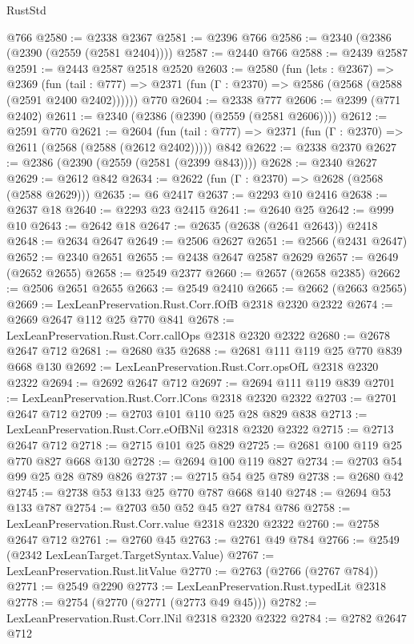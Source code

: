 \begin{lexlean}{RustStd}
\begin{coremodule}
    @766
@2580 := @2338 @2367
@2581 := @2396 @766
@2586 := @2340 (@2386 (@2390 (@2559 (@2581 @2404))))
@2587 := @2440 @766
@2588 := @2439 @2587
@2591 := @2443 @2587 @2518 @2520
@2603 := @2580
    (fun (lets : @2367) =>
    @2369
      (fun (tail : @777) => @2371 (fun (Γ : @2370) => @2586 (@2568 (@2588 (@2591 @2400 @2402))))))
    @770
@2604 := @2338 @777
@2606 := @2399 (@771 @2402)
@2611 := @2340 (@2386 (@2390 (@2559 (@2581 @2606))))
@2612 := @2591 @770
@2621 := @2604
    (fun (tail : @777) => @2371 (fun (Γ : @2370) => @2611 (@2568 (@2588 (@2612 @2402)))))
    @842
@2622 := @2338 @2370
@2627 := @2386 (@2390 (@2559 (@2581 (@2399 @843))))
@2628 := @2340 @2627
@2629 := @2612 @842
@2634 := @2622 (fun (Γ : @2370) => @2628 (@2568 (@2588 @2629)))
@2635 := @6 @2417
@2637 := @2293 @10 @2416
@2638 := @2637 @18
@2640 := @2293 @23 @2415
@2641 := @2640 @25
@2642 := @999 @10
@2643 := @2642 @18
@2647 := @2635 (@2638 (@2641 @2643)) @2418
@2648 := @2634 @2647
@2649 := @2506 @2627
@2651 := @2566 (@2431 @2647)
@2652 := @2340 @2651
@2655 := @2438 @2647 @2587 @2629
@2657 := @2649 (@2652 @2655)
@2658 := @2549 @2377
@2660 := @2657 (@2658 @2385)
@2662 := @2506 @2651 @2655
@2663 := @2549 @2410
@2665 := @2662 (@2663 @2565)
@2669 := LexLeanPreservation.Rust.Corr.fOfB @2318 @2320 @2322
@2674 := @2669 @2647 @112 @25 @770 @841
@2678 := LexLeanPreservation.Rust.Corr.callOps @2318 @2320 @2322
@2680 := @2678 @2647 @712
@2681 := @2680 @35
@2688 := @2681 @111 @119 @25 @770 @839 @668 @130
@2692 := LexLeanPreservation.Rust.Corr.opsOfL @2318 @2320 @2322
@2694 := @2692 @2647 @712
@2697 := @2694 @111 @119 @839
@2701 := LexLeanPreservation.Rust.Corr.lCons @2318 @2320 @2322
@2703 := @2701 @2647 @712
@2709 := @2703 @101 @110 @25 @28 @829 @838
@2713 := LexLeanPreservation.Rust.Corr.eOfBNil @2318 @2320 @2322
@2715 := @2713 @2647 @712
@2718 := @2715 @101 @25 @829
@2725 := @2681 @100 @119 @25 @770 @827 @668 @130
@2728 := @2694 @100 @119 @827
@2734 := @2703 @54 @99 @25 @28 @789 @826
@2737 := @2715 @54 @25 @789
@2738 := @2680 @42
@2745 := @2738 @53 @133 @25 @770 @787 @668 @140
@2748 := @2694 @53 @133 @787
@2754 := @2703 @50 @52 @45 @27 @784 @786
@2758 := LexLeanPreservation.Rust.Corr.value @2318 @2320 @2322
@2760 := @2758 @2647 @712
@2761 := @2760 @45
@2763 := @2761 @49 @784
@2766 := @2549 (@2342 LexLeanTarget.TargetSyntax.Value)
@2767 := LexLeanPreservation.Rust.litValue
@2770 := @2763 (@2766 (@2767 @784))
@2771 := @2549 @2290
@2773 := LexLeanPreservation.Rust.typedLit @2318
@2778 := @2754 (@2770 (@2771 (@2773 @49 @45)))
@2782 := LexLeanPreservation.Rust.Corr.lNil @2318 @2320 @2322
@2784 := @2782 @2647 @712

\end{coremodule}
\end{lexlean}
